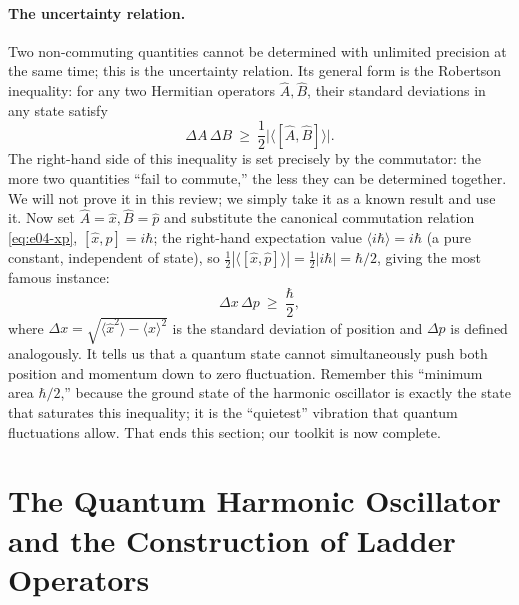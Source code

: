 \paragraph{The uncertainty relation.}
Two non-commuting quantities cannot be determined with unlimited precision at the same time; this is the uncertainty relation. Its general form is the Robertson inequality: for any two Hermitian operators \(\hat A,\hat B\), their standard deviations in any state satisfy
\[
  \Delta A\,\Delta B\ \ge\ \frac12\big|\langle[\hat A,\hat B]\rangle\big| .
\]
The right-hand side of this inequality is set precisely by the commutator: the more two quantities ``fail to commute,'' the less they can be determined together. We will not prove it in this review; we simply take it as a known result and use it. Now set \(\hat A=\hat x,\hat B=\hat p\) and substitute the canonical commutation relation \eqref{eq:e04-xp}, \([\hat x,\hat p]=i\hbar\); the right-hand expectation value \(\langle i\hbar\rangle=i\hbar\) (a pure constant, independent of state), so \(\tfrac12|\langle[\hat x,\hat p]\rangle|=\tfrac12|i\hbar|=\hbar/2\), giving the most famous instance:
\[
  \Delta x\,\Delta p\ \ge\ \frac{\hbar}{2},
\]
where \(\Delta x=\sqrt{\langle \hat x^2\rangle-\langle\hat x\rangle^2}\) is the standard deviation of position and \(\Delta p\) is defined analogously. It tells us that a quantum state cannot simultaneously push both position and momentum down to zero fluctuation. Remember this ``minimum area \(\hbar/2\),'' because the ground state of the harmonic oscillator is exactly the state that saturates this inequality; it is the ``quietest'' vibration that quantum fluctuations allow. That ends this section; our toolkit is now complete.

\section{The Quantum Harmonic Oscillator and the Construction of Ladder Operators}
\label{sec:e04-ladder}


